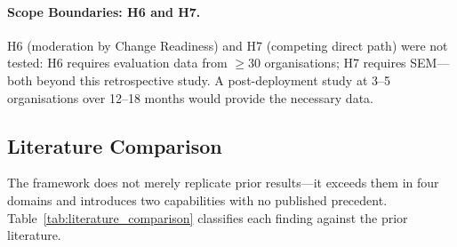 \paragraph{Scope Boundaries: H6 and H7.}

H6 (moderation by Change Readiness) and H7 (competing direct path) were not tested: H6 requires evaluation data from $\geq$30 organisations; H7 requires SEM---both beyond this retrospective study. A post-deployment study at 3--5 organisations over 12--18 months would provide the necessary data.

\subsection{Literature Comparison}

The framework does not merely replicate prior results---it exceeds them in four domains and introduces two capabilities with no published precedent. Table~\ref{tab:literature_comparison} classifies each finding against the prior literature.

